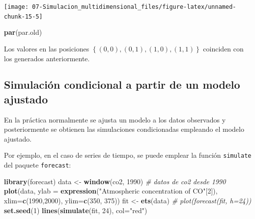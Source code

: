 \documentclass[
]{book}
\newenvironment{Shaded}{\begin{snugshade}}{\end{snugshade}}
\newcommand{\CommentTok}[1]{\textcolor[rgb]{0.56,0.35,0.01}{\textit{#1}}}
\newcommand{\DataTypeTok}[1]{\textcolor[rgb]{0.13,0.29,0.53}{#1}}
\newcommand{\DecValTok}[1]{\textcolor[rgb]{0.00,0.00,0.81}{#1}}
\newcommand{\KeywordTok}[1]{\textcolor[rgb]{0.13,0.29,0.53}{\textbf{#1}}}
\newcommand{\NormalTok}[1]{#1}
\newcommand{\OperatorTok}[1]{\textcolor[rgb]{0.81,0.36,0.00}{\textbf{#1}}}
\newcommand{\StringTok}[1]{\textcolor[rgb]{0.31,0.60,0.02}{#1}}
\theoremstyle{break}
\theoremstyle{definition}
\theoremstyle{definition}
\theoremstyle{definition}
\theoremstyle{remark}
\begin{document}
\begin{Shaded}
\end{Shaded}

\begin{center}\texttt{[image: 07-Simulacion\_multidimensional\_files/figure-latex/unnamed-chunk-15-5]} \end{center}

\begin{Shaded}
\begin{Highlighting}[]
\KeywordTok{par}\NormalTok{(par.old)}
\end{Highlighting}
\end{Shaded}

Los valores en las posiciones \(\left\{(0,0),(0,1),(1,0),(1,1)\right\}\)
coinciden con los generados anteriormente.

\hypertarget{simulaciuxf3n-condicional-a-partir-de-un-modelo-ajustado}{%
\subsection{Simulación condicional a partir de un modelo ajustado}\label{simulaciuxf3n-condicional-a-partir-de-un-modelo-ajustado}}

En la práctica normalmente se ajusta un modelo a los datos observados y
posteriormente se obtienen las simulaciones condicionadas empleando
el modelo ajustado.

Por ejemplo, en el caso de series de tiempo, se puede emplear la función \texttt{simulate}
del paquete \texttt{forecast}:

\begin{Shaded}
\begin{Highlighting}[]
\KeywordTok{library}\NormalTok{(forecast)}
\NormalTok{data <-}\StringTok{ }\KeywordTok{window}\NormalTok{(co2, }\DecValTok{1990}\NormalTok{) }\CommentTok{# datos de co2 desde 1990}
\KeywordTok{plot}\NormalTok{(data, }\DataTypeTok{ylab =} \KeywordTok{expression}\NormalTok{(}\StringTok{"Atmospheric concentration of CO"}\NormalTok{[}\DecValTok{2}\NormalTok{]), }
     \DataTypeTok{xlim=}\KeywordTok{c}\NormalTok{(}\DecValTok{1990}\NormalTok{,}\DecValTok{2000}\NormalTok{), }\DataTypeTok{ylim=}\KeywordTok{c}\NormalTok{(}\DecValTok{350}\NormalTok{, }\DecValTok{375}\NormalTok{))}
\NormalTok{fit <-}\StringTok{ }\KeywordTok{ets}\NormalTok{(data)}
\CommentTok{# plot(forecast(fit, h=24))}
\KeywordTok{set.seed}\NormalTok{(}\DecValTok{1}\NormalTok{)}
\KeywordTok{lines}\NormalTok{(}\KeywordTok{simulate}\NormalTok{(fit, }\DecValTok{24}\NormalTok{), }\DataTypeTok{col=}\StringTok{"red"}\NormalTok{)}
\end{Highlighting}
\end{Shaded}
\end{document}
